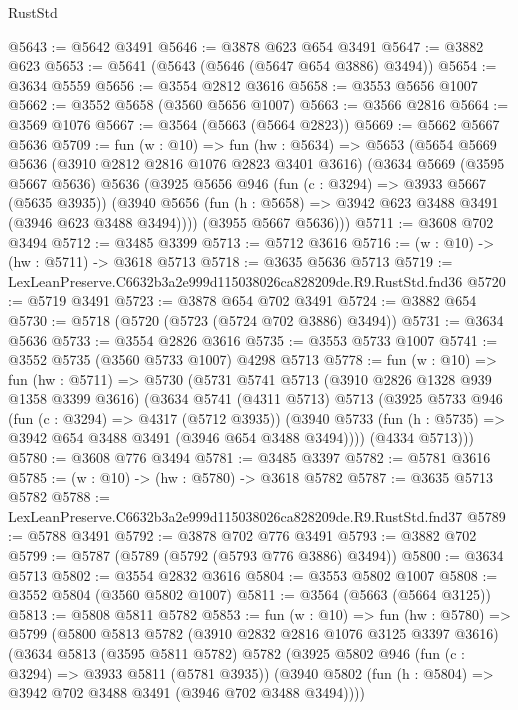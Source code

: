 \begin{lexlean}{RustStd}
\begin{coremodule}
@5643 := @5642 @3491
@5646 := @3878 @623 @654 @3491
@5647 := @3882 @623
@5653 := @5641 (@5643 (@5646 (@5647 @654 @3886) @3494))
@5654 := @3634 @5559
@5656 := @3554 @2812 @3616
@5658 := @3553 @5656 @1007
@5662 := @3552 @5658 (@3560 @5656 @1007)
@5663 := @3566 @2816
@5664 := @3569 @1076
@5667 := @3564 (@5663 (@5664 @2823))
@5669 := @5662 @5667 @5636
@5709 := fun (w : @10) =>
  fun (hw : @5634) =>
  @5653
    (@5654
      @5669
      @5636
      (@3910 @2812 @2816 @1076 @2823 @3401 @3616)
      (@3634
        @5669
        (@3595 @5667 @5636)
        @5636
        (@3925
          @5656
          @946
          (fun (c : @3294) => @3933 @5667 (@5635 @3935))
          (@3940 @5656 (fun (h : @5658) => @3942 @623 @3488 @3491 (@3946 @623 @3488 @3494))))
        (@3955 @5667 @5636)))
@5711 := @3608 @702 @3494
@5712 := @3485 @3399
@5713 := @5712 @3616
@5716 := (w : @10) -> (hw : @5711) -> @3618 @5713
@5718 := @3635 @5636 @5713
@5719 := LexLeanPreserve.C6632b3a2e999d115038026ca828209de.R9.RustStd.fnd36
@5720 := @5719 @3491
@5723 := @3878 @654 @702 @3491
@5724 := @3882 @654
@5730 := @5718 (@5720 (@5723 (@5724 @702 @3886) @3494))
@5731 := @3634 @5636
@5733 := @3554 @2826 @3616
@5735 := @3553 @5733 @1007
@5741 := @3552 @5735 (@3560 @5733 @1007) @4298 @5713
@5778 := fun (w : @10) =>
  fun (hw : @5711) =>
  @5730
    (@5731
      @5741
      @5713
      (@3910 @2826 @1328 @939 @1358 @3399 @3616)
      (@3634
        @5741
        (@4311 @5713)
        @5713
        (@3925
          @5733
          @946
          (fun (c : @3294) => @4317 (@5712 @3935))
          (@3940 @5733 (fun (h : @5735) => @3942 @654 @3488 @3491 (@3946 @654 @3488 @3494))))
        (@4334 @5713)))
@5780 := @3608 @776 @3494
@5781 := @3485 @3397
@5782 := @5781 @3616
@5785 := (w : @10) -> (hw : @5780) -> @3618 @5782
@5787 := @3635 @5713 @5782
@5788 := LexLeanPreserve.C6632b3a2e999d115038026ca828209de.R9.RustStd.fnd37
@5789 := @5788 @3491
@5792 := @3878 @702 @776 @3491
@5793 := @3882 @702
@5799 := @5787 (@5789 (@5792 (@5793 @776 @3886) @3494))
@5800 := @3634 @5713
@5802 := @3554 @2832 @3616
@5804 := @3553 @5802 @1007
@5808 := @3552 @5804 (@3560 @5802 @1007)
@5811 := @3564 (@5663 (@5664 @3125))
@5813 := @5808 @5811 @5782
@5853 := fun (w : @10) =>
  fun (hw : @5780) =>
  @5799
    (@5800
      @5813
      @5782
      (@3910 @2832 @2816 @1076 @3125 @3397 @3616)
      (@3634
        @5813
        (@3595 @5811 @5782)
        @5782
        (@3925
          @5802
          @946
          (fun (c : @3294) => @3933 @5811 (@5781 @3935))
          (@3940 @5802 (fun (h : @5804) => @3942 @702 @3488 @3491 (@3946 @702 @3488 @3494))))

\end{coremodule}
\end{lexlean}
